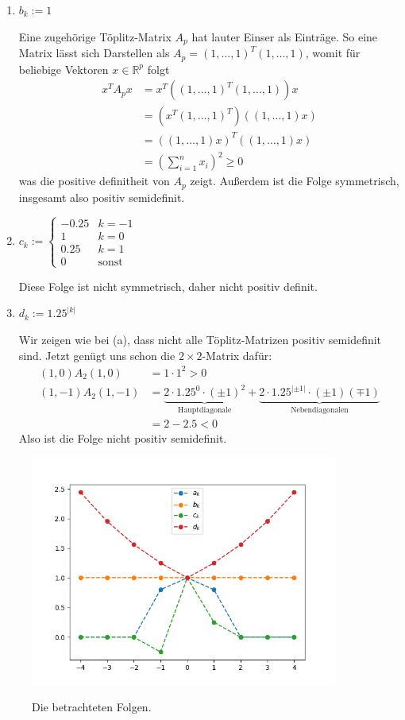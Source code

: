 \documentclass[a4paper,11pt,notitlepage,fullpage]{article}
\begin{document}
\begin{enumerate}
\begin{enumerate}
\item $b_k := 1$

Eine zugehörige Töplitz-Matrix $A_p$ hat lauter Einser als Einträge. So eine Matrix lässt sich Darstellen als $A_p= (1, \ldots, 1)^T (1, \ldots, 1)$, womit für beliebige Vektoren $x\in \mathbb{R}^p$ folgt
\begin{align*}
x^T A_p x &= x^T \left( (1, \ldots, 1)^T (1, \ldots, 1) \right) x\\
&= \left( x^T  (1, \ldots, 1)^T \right) \left( (1, \ldots, 1)  x \right)\\
&=\left( (1, \ldots, 1) x \right)^T \left( (1, \ldots, 1)  x \right)\\
&= \left( \sum_{i=1}^n x_i \right)^2 \geq 0
\end{align*}
was die positive definitheit von $A_p$ zeigt. Außerdem ist die Folge symmetrisch, insgesamt also positiv semidefinit.

\item $c_k := \begin{cases}
-0.25 & k = -1 \\
1 & k = 0 \\
0.25 & k = 1 \\
0 & \text{sonst}
\end{cases}$

Diese Folge ist nicht symmetrisch, daher nicht positiv definit.

\item $d_k := 1.25^{|k|}$

Wir zeigen wie bei (a), dass nicht alle Töplitz-Matrizen positiv semidefinit sind. Jetzt genügt uns schon die $2\times 2$-Matrix dafür:
\begin{align*}
(1,0) A_2 (1,0) &= 1\cdot 1^2 > 0\\
(1,-1) A_2 (1,-1) &= \underbrace{2\cdot 1.25^0 \cdot (\pm 1)^2}_{\text{Hauptdiagonale}} + \underbrace{2\cdot 1.25^{|\pm 1|}\cdot (\pm 1)(\mp 1)}_{\text{Nebendiagonalen}}\\
&= 2 - 2.5 < 0
\end{align*}
Also ist die Folge nicht positiv semidefinit.
\end{enumerate}

\begin{figure}[h!]
\centering
\includegraphics[width=0.9\textwidth]{gfx/34_fig.png}
\label{fig2}
\caption{Die betrachteten Folgen.}
\end{figure}


\end{enumerate}
\end{document}
